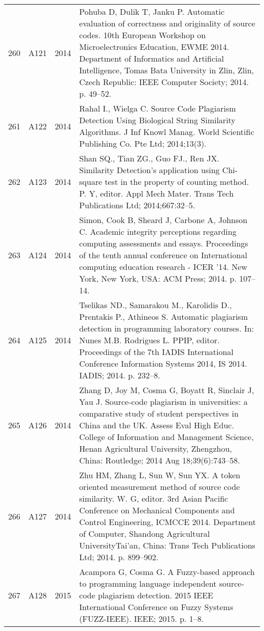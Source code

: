\documentclass{article}\usepackage[]{graphicx}\usepackage[]{color}
\begin{document}
\begin{longtable}{l|L{1cm}|L{1cm}|L{12cm}|}
  260 & A121 & 2014 & Pohuba D, Dulik T, Janku P. Automatic evaluation of correctness and originality of source codes. 10th European Workshop on Microelectronics Education, EWME 2014. Department of Informatics and Artificial Intelligence, Tomas Bata University in Zlin, Zlin, Czech Republic: IEEE Computer Society; 2014. p. 49–52. \\ 
  261 & A122 & 2014 & Rahal I., Wielga C. Source Code Plagiarism Detection Using Biological String Similarity Algorithms. J Inf Knowl Manag. World Scientific Publishing Co. Pte Ltd; 2014;13(3). \\ 
  262 & A123 & 2014 & Shan SQ., Tian ZG., Guo FJ., Ren JX. Similarity Detection’s application using Chi-square test in the property of counting method. P. Y, editor. Appl Mech Mater. Trans Tech Publications Ltd; 2014;667:32–5. \\ 
  263 & A124 & 2014 & Simon, Cook B, Sheard J, Carbone A, Johnson C. Academic integrity perceptions regarding computing assessments and essays. Proceedings of the tenth annual conference on International computing education research - ICER ’14. New York, New York, USA: ACM Press; 2014. p. 107–14. \\ 
  264 & A125 & 2014 & Tselikas ND., Samarakou M., Karolidis D., Prentakis P., Athineos S. Automatic plagiarism detection in programming laboratory courses. In: Nunes M.B. Rodrigues L. PPIP, editor. Proceedings of the 7th IADIS International Conference Information Systems 2014, IS 2014. IADIS; 2014. p. 232–8. \\ 
  265 & A126 & 2014 & Zhang D, Joy M, Cosma G, Boyatt R, Sinclair J, Yau J. Source-code plagiarism in universities: a comparative study of student perspectives in China and the UK. Assess Eval High Educ. College of Information and Management Science, Henan Agricultural University, Zhengzhou, China: Routledge; 2014 Aug 18;39(6):743–58. \\ 
  266 & A127 & 2014 & Zhu HM, Zhang L, Sun W, Sun YX. A token oriented measurement method of source code similarity. W. G, editor. 3rd Asian Pacific Conference on Mechanical Components and Control Engineering, ICMCCE 2014. Department of Computer, Shandong Agricultural UniversityTai’an, China: Trans Tech Publications Ltd; 2014. p. 899–902. \\ 
  267 & A128 & 2015 & Acampora G, Cosma G. A Fuzzy-based approach to programming language independent source-code plagiarism detection. 2015 IEEE International Conference on Fuzzy Systems (FUZZ-IEEE). IEEE; 2015. p. 1–8. \\ 

\end{longtable}
\end{document}
